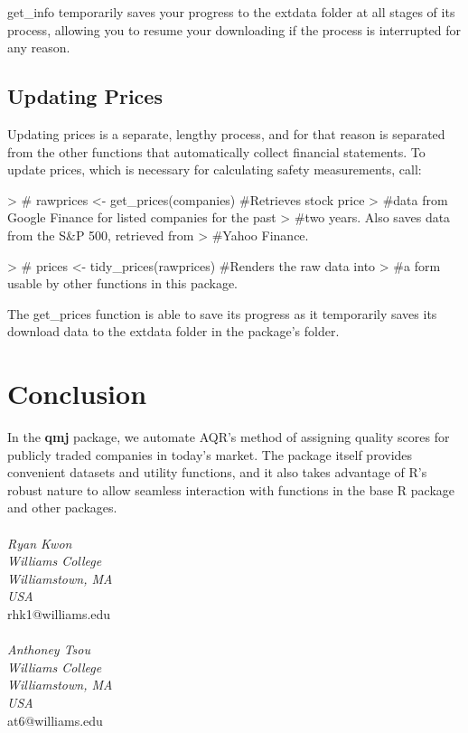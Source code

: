 \documentclass[12pt]{article}
\begin{document}
get\_info temporarily saves your progress to the extdata folder at all stages of its process, allowing you to resume your downloading if the process is interrupted for any reason.

\subsection*{Updating Prices}
Updating prices is a separate, lengthy process, and for that reason is separated from the other functions that automatically collect financial statements. To update prices, which is necessary for calculating safety measurements, call:

\begin{Schunk}
\begin{Sinput}
> # rawprices <- get_prices(companies) #Retrieves stock price 
> #data from Google Finance for listed companies for the past 
> #two years. Also saves data from the S&P 500, retrieved from 
> #Yahoo Finance.
\end{Sinput}
\end{Schunk}
\begin{Schunk}
\begin{Sinput}
> # prices <- tidy_prices(rawprices) #Renders the raw data into 
> #a form usable by other functions in this package.
\end{Sinput}
\end{Schunk}

The get\_prices function is able to save its progress as it temporarily saves its download data to the extdata folder in the package's folder.

\section*{Conclusion}

In the \textbf{qmj} package, we automate AQR's method of assigning quality scores for publicly traded companies in today's market. The package itself provides convenient datasets and utility functions, and it also takes advantage of R's robust nature to allow seamless interaction with functions in the base R package and other packages.
\\
\\
\emph{Ryan Kwon}
\\
\emph{Williams College}
\\
\emph{Williamstown, MA}
\\
\emph{USA}
\\
rhk1@williams.edu
\\
\\
\emph{Anthoney Tsou}
\\
\emph{Williams College}
\\
\emph{Williamstown, MA}
\\
\emph{USA}
\\
at6@williams.edu
\end{document}
